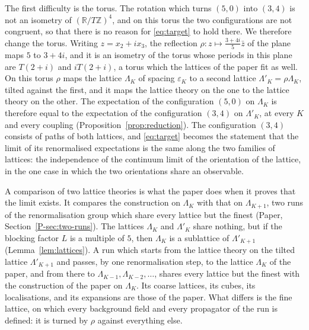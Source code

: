 \documentclass[11pt]{preprint}
\numberwithin{equation}{section}
\theoremstyle{definition}
\theoremstyle{remark}
\theoremstyle{plain}
\begin{document}
The first difficulty is the torus. The rotation which turns $(5, 0)$ into $(3, 4)$ is not an isometry of $(\mathbb R/T\mathbb Z)^4$, and on this torus the two configurations are not congruent, so that there is no reason for \eqref{eq:target} to hold there. We therefore change the torus. Writing $z = x_2 + ix_3$, the reflection $\rho \colon z \mapsto \frac{3 + 4i}{5}\bar z$ of the plane maps $5$ to $3 + 4i$, and it is an isometry of the torus whose periods in this plane are $T(2 + i)$ and $iT(2 + i)$, a torus which the lattices of the paper fit as well. On this torus $\rho$ maps the lattice $\Lambda_K$ of spacing $\varepsilon_K$ to a second lattice $\Lambda'_K = \rho\Lambda_K$, tilted against the first, and it maps the lattice theory on the one to the lattice theory on the other. The expectation of the configuration $(5, 0)$ on $\Lambda_K$ is therefore equal to the expectation of the configuration $(3, 4)$ on $\Lambda'_K$, at every $K$ and every coupling (Proposition~\ref{prop:reduction}). The configuration $(3, 4)$ consists of paths of both lattices, and \eqref{eq:target} becomes the statement that the limit of its renormalised expectations is the same along the two families of lattices: the independence of the continuum limit of the orientation of the lattice, in the one case in which the two orientations share an observable.

A comparison of two lattice theories is what the paper does when it proves that the limit exists. It compares the construction on $\Lambda_K$ with that on $\Lambda_{K+1}$, two runs of the renormalisation group which share every lattice but the finest (Paper, Section~\ref{P-sec:two-runs}). The lattices $\Lambda_K$ and $\Lambda'_K$ share nothing, but if the blocking factor $L$ is a multiple of $5$, then $\Lambda_K$ is a sublattice of $\Lambda'_{K+1}$ (Lemma~\ref{lem:lattices}). A run which starts from the lattice theory on the tilted lattice $\Lambda'_{K+1}$ and passes, by one renormalisation step, to the lattice $\Lambda_K$ of the paper, and from there to $\Lambda_{K-1}, \Lambda_{K-2}, \dots$, shares every lattice but the finest with the construction of the paper on $\Lambda_K$. Its coarse lattices, its cubes, its localisations, and its expansions are those of the paper. What differs is the fine lattice, on which every background field and every propagator of the run is defined: it is turned by $\rho$ against everything else.
\end{document}
